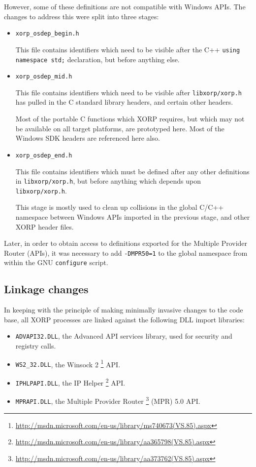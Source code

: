 \documentclass[11pt]{article}
\begin{document}
However, some of these definitions are not compatible with Windows APIs.
The changes to address this were split into three stages:
\begin{itemize}

 \item {\tt xorp\_osdep\_begin.h}

This file contains identifiers which need to be visible after the C++
{\tt using namespace std;} declaration, but before anything else.

 \item {\tt xorp\_osdep\_mid.h}

This file contains identifiers which need to be visible after {\tt libxorp/xorp.h} has pulled in
the C standard library headers, and certain other headers.

Most of the portable C functions which XORP requires, but which may
not be available on all target platforms, are prototyped here.
Most of the Windows SDK headers are referenced here also.

 \item {\tt xorp\_osdep\_end.h}

This file contains identifiers which must be defined after any other definitions in {\tt libxorp/xorp.h},
but before anything which depends upon {\tt libxorp/xorp.h}.

This stage is mostly used to clean up collisions in the global C/C++ namespace
between Windows APIs imported in the previous stage, and other XORP header files.

\end{itemize}

Later, in order to obtain access to definitions exported for the Multiple
Provider Router (APIs), it was necessary to add {\tt -DMPR50=1} to the global
namespace from within the GNU {\tt configure} script.

\subsection{Linkage changes}

In keeping with the principle of making minimally invasive changes to the
code base, all XORP processes are linked against the following DLL import
libraries:
\begin{itemize}
 \item {\tt ADVAPI32.DLL}, the Advanced API services library, used for security and registry calls.
 \item {\tt WS2\_32.DLL}, the Winsock 2
\footnote{\url{http://msdn.microsoft.com/en-us/library/ms740673(VS.85).aspx}}
API.
 \item {\tt IPHLPAPI.DLL}, the IP Helper
\footnote{\url{http://msdn.microsoft.com/en-us/library/aa365798(VS.85).aspx}}
API.
 \item {\tt MPRAPI.DLL}, the Multiple Provider Router
\footnote{\url{http://msdn.microsoft.com/en-us/library/aa373762(VS.85).aspx}}
(MPR) 5.0 API.
\end{itemize}
\end{document}
